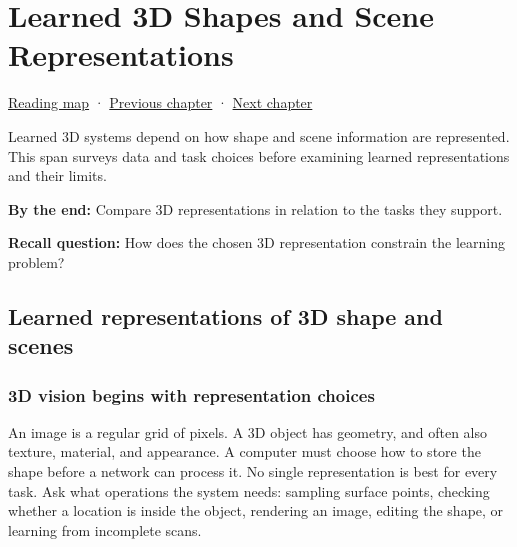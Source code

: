 \chapter{Learned 3D Shapes and Scene Representations}\label{04-visual-computing-ii-ch034-learned-3d-shapes-and-scene-representations}\hypertarget{04-visual-computing-ii-ch034}{}\label{stagechapter:04-visual-computing-ii-ch034}

\hypertarget{04-visual-computing-ii-ch034-learned-3d-shapes-and-scene-representations}{}

\hyperref[volume-reading-map]{Reading map} · \hyperref[04-visual-computing-ii-ch032]{Previous chapter} · \hyperref[04-visual-computing-ii-ch036]{Next chapter}

Learned 3D systems depend on how shape and scene information are represented. This span surveys data and task choices before examining learned representations and their limits.

\textbf{By the end:} Compare 3D representations in relation to the tasks they support.

\textbf{Recall question:} How does the chosen 3D representation constrain the learning problem?

\section{Learned representations of 3D shape and scenes}\label{04-visual-computing-ii-ch034-learned-representations-of-3d-shape-and-scenes}

\hypertarget{04-visual-computing-ii-ch034-learned-representations-of-3d-shape-and-scenes}{}

\subsection{3D vision begins with representation choices}\label{04-visual-computing-ii-ch034-d-vision-begins-with-representation-choices}

\hypertarget{04-visual-computing-ii-ch034-d-vision-begins-with-representation-choices}{}

An image is a regular grid of pixels. A 3D object has geometry, and often also texture, material, and appearance. A computer must choose how to store the shape before a network can process it. No single representation is best for every task. Ask what operations the system needs: sampling surface points, checking whether a location is inside the object, rendering an image, editing the shape, or learning from incomplete scans.

